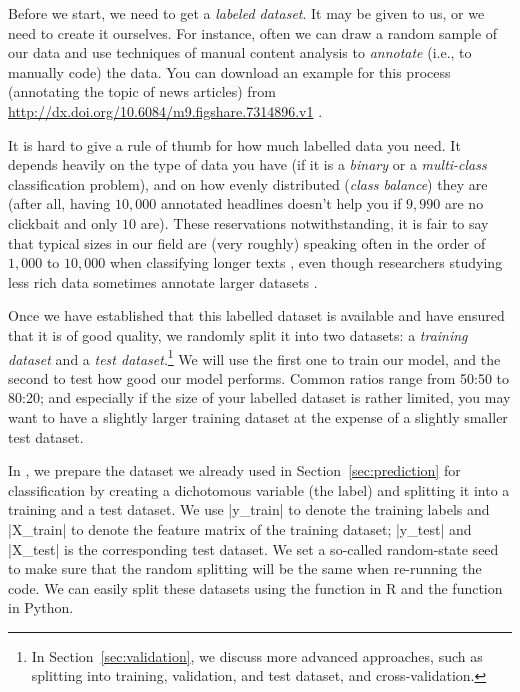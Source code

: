 Before we start, we need to get a \emph{labeled dataset}.
It may be given to us, or we need to create it ourselves.
For instance, often we can draw a random sample of our data and use techniques
of manual content analysis \citep[e.g.,][]{riffe2019analyzing} to
\emph{annotate} (i.e., to manually code) the data.
You can download an example for this process (annotating the topic of news
articles) from \url{http://dx.doi.org/10.6084/m9.figshare.7314896.v1} \citep{Vermeer2018}.

It is hard to give a rule of thumb for how much labelled data you need.
It depends heavily on the type of data you have (if it is a \emph{binary} or a \emph{multi-class} classification problem), and on how evenly distributed (\emph{class balance}) they are (after all, having $10,000$ annotated headlines doesn't help you if $9,990$ are no clickbait and only $10$ are).
These reservations notwithstanding, it is fair to say that typical sizes in
our field are (very roughly) speaking often in the order of $1,000$ to $10,000$
when classifying longer texts \citep[see][]{Burscher2014},
even though researchers studying less rich data sometimes annotate larger
datasets \citep[e.g., $60,000$ social media messages in][]{vermeer2019seeing}.

Once we have established that this labelled dataset is available and
have ensured that it is of good quality, we randomly split it into two
datasets: a \emph{training dataset} and a \emph{test
  dataset}.\footnote{In Section~\ref{sec:validation}, we discuss more
  advanced approaches, such as splitting into training, validation,
  and test dataset, and cross-validation.}  We will use the first one
to train our model, and the second to test how good our model
performs. Common ratios range from 50:50 to 80:20; and especially if
the size of your labelled dataset is rather limited, you may want to
have a slightly larger training dataset at the expense of a slightly
smaller test dataset.

In , we prepare the dataset we already used in
Section~\ref{sec:prediction} for classification by creating a
dichotomous variable (the label) and splitting it into a training and
a test dataset. We use |y_train| to denote the training labels and
|X_train| to denote the feature matrix of the training dataset;
|y_test| and |X_test| is the corresponding test dataset. We set a
so-called random-state seed to make sure that the random splitting
will be the same when re-running the code. We can easily split these datasets using the  function  in R and the  function  in Python.

